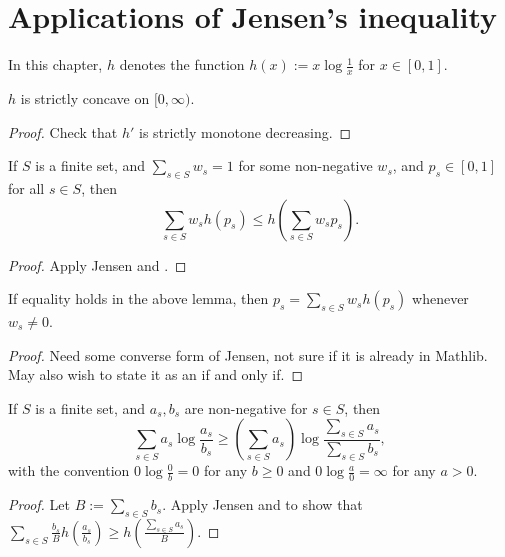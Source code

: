 \chapter{Applications of Jensen's inequality}

In this chapter, $h$ denotes the function $h(x) := x \log \frac{1}{x}$ for $x \in [0,1]$.

\begin{lemma}[Concavity]\label{concave}
  \leanok
  $h$ is strictly concave on $[0,\infty)$.
\end{lemma}

\begin{proof} \leanok Check that $h'$ is strictly monotone decreasing.
\end{proof}


\begin{lemma}[Jensen]\label{jensen}
   \leanok
  If $S$ is a finite set, and $\sum_{s \in S} w_s = 1$ for some non-negative $w_s$, and $p_s \in [0,1]$ for all $s \in S$, then
  $$ \sum_{s \in S} w_s h(p_s) \leq h(\sum_{s \in S} w_s p_s).$$
\end{lemma}

\begin{proof} \leanok Apply Jensen and .
\end{proof}

\begin{lemma}\label{converse-jensen}
  \leanok
If equality holds in the above lemma, then $p_s = \sum_{s \in S} w_s h(p_s)$ whenever $w_s \neq 0$.
\end{lemma}

\begin{proof} \leanok Need some converse form of Jensen, not sure if it is already in Mathlib.  May also wish to state it as an if and only if.
\end{proof}

\begin{lemma}
  \label{log-sum}\leanok
  If $S$ is a finite set, and $a_s,b_s$ are non-negative for $s\in S$, then
  $$\sum_{s\in S} a_s \log\frac{a_s}{b_s}\ge \left(\sum_{s\in S}a_s\right)\log\frac{\sum_{s\in S} a_s}{\sum_{s\in S} b_s},$$
  with the convention $0\log\frac{0}{b}=0$ for any $b\ge 0$ and $0\log\frac{a}{0}=\infty$ for any $a>0$.
\end{lemma}
\begin{proof}
  Let $B:=\sum_{s\in S} b_s$. Apply Jensen and  to show that $\sum_{s\in S} \frac{b_s}{B} h(\frac{a_s}{b_s})\ge h(\frac{\sum_{s\in S} a_s}{B})$.
\end{proof}

